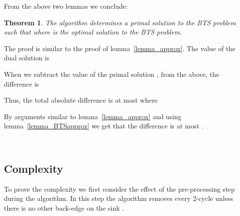 \documentclass[11pt]{article}
\newenvironment{proof}{\par\noindent{\bf Proof:}}{\mbox{}\hfill\\}
\newtheorem{theorem}{Theorem}[section]
\newcounter{rem}
\newcommand{\ignore}[1]{ }
\begin{document}
From the above two lemmas 
we conclude:
\begin{theorem}
The algorithm determines a  primal solution to the BTS problem such
that  where  is the optimal
solution to the BTS problem.
\end{theorem}
\begin{proof}
The proof is similar to the proof  of  lemma~\ref{lemma_approx}.
The value of the dual solution is 


When we subtract the value of the primal solution , from the
above, the  difference is



Thus, the total absolute difference is at most  where









By arguments similar to lemma~\ref{lemma_approx} and using lemma~\ref{lemma_BTSapprox}
we get that the difference is at most  .
\ignore{
From lemma \ref{lemma_primalCS}, we have 



Therefore, 



From the termination condition of the algorithm, we know that for any source
 such that , we have .

Therefore 





For all unsaturated sinks . Therefore, 

}

\end{proof}




\subsection{Complexity}
To prove the complexity we  first consider the effect of the pre-processing
step during the algorithm.
In this step the algorithm
removes every 2-cycle unless there is no other back-edge
on the sink .  
\end{document}
